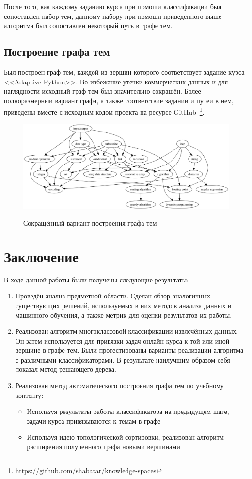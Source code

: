 \documentclass[14pt]{matmex-diploma-custom}
\begin{document}
После того, как каждому заданию курса при помощи классификации был сопоставлен набор тем, данному набору при помощи приведенного выше алгоритма был сопоставлен некоторый путь в графе тем.

\subsection{Построение графа тем}
Был построен граф тем, каждой из вершин которого соответствует задание курса <<Adaptive Python>>. Во избежание утечки коммерческих данных и для наглядности исходный граф тем был значительно сокращён. Более полноразмерный вариант графа, а также соответствие заданий и путей в нём, приведены вместе с исходным кодом проекта на ресурсе GitHub~\footnote{\url{https://github.com/shabatar/knowledge-spaces}}.

\begin{figure}[!htb]
\caption{Сокращённый вариант построения графа тем}
\hspace*{-2cm}\includegraphics[width=18cm]{themegraph}
\label{themegraph}
\end{figure}


\section*{Заключение}
В ходе данной работы были получены следующие результаты:

\begin{enumerate}
    \item Проведён анализ предметной области. Сделан обзор аналогичных существующих решений, используемых в них методов анализа данных и машинного обучения, а также метрик для оценки результатов их работы. 
    \item Реализован алгоритм многоклассовой классификации извлечённых данных. Он затем используется для привязки задач онлайн-курса к той или иной вершине в графе тем. Были протестированы варианты реализации алгоритма с различными классификаторами. В результате наилучшим образом себя показал метод решающего дерева.
    \item Реализован метод автоматического построения графа тем по учебному контенту:
    \begin{itemize}
        \item Используя результаты работы классификатора на предыдущем шаге, задачи курса привязываются к темам в графе
        \item Используя идею топологической сортировки, реализован алгоритм расширения полученного графа новыми вершинами
    \end{itemize}
\end{enumerate}

\setmonofont[Mapping=tex-text]{CMU Typewriter Text}


\end{document}

